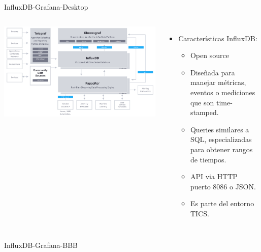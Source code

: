\documentclass[aspectratio= 43]{beamer}
\begin{document}
\begin{frame}{InfluxDB-Grafana-Desktop}
   \begin{columns}
      \includegraphics [scale = 0.2 ]{./Images/TICS.png}
      \begin{itemize}
       \item{Características InfluxDB:}
        \begin{itemize}
               \item {Open source}
               \item {Diseñada para manejar métricas, eventos o mediciones que son time-stamped.}
               \item {Queries similares a SQL, especializadas para obtener rangos de tiempos.}
               \item {API via HTTP puerto 8086 o JSON.}
               \item {Es parte del entorno TICS.}
        \end{itemize}
    \end{itemize}
   \end{columns}
  \end{frame}

\begin{frame}{InfluxDB-Grafana-BBB}
\end{frame}
\end{document}
